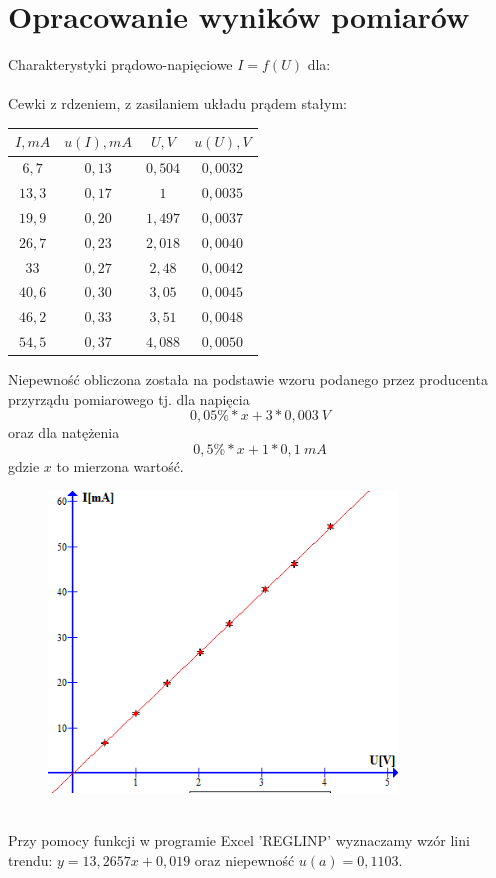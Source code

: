 \documentclass{article}
\begin{document}
\section{Opracowanie wyników pomiarów}
Charakterystyki prądowo-napięciowe $I = f(U)$ dla:\\\\
Cewki z rdzeniem, z zasilaniem układu prądem stałym:
\begin{center}
    \begin{tabular}{|c|c|c|c|}
    \hline
$I,mA$ & $u(I), mA$ & $U,V$ & $u(U), V$ \\ \hline
$6,7$ & $0,13$ & $0,504$ & $0,0032$\\ \hline
$13,3$ & $0,17$ & $1$ & $0,0035$\\ \hline
$19,9$ & $0,20$ & $1,497$ & $0,0037$\\ \hline
$26,7$ & $0,23$ & $2,018$ & $0,0040$\\ \hline
$33$ & $0,27$ & $2,48$ & $0,0042$\\ \hline
$40,6$ & $0,30$ & $3,05$ & $0,0045$\\ \hline
$46,2$ & $0,33$ & $3,51$ & $0,0048$\\ \hline
$54,5$ & $0,37$ & $4,088$ & $0,0050$\\ \hline
    \end{tabular}
\end{center}
Niepewność obliczona została na podstawie wzoru podanego przez producenta przyrządu pomiarowego tj. dla napięcia
$$0,05\% * x + 3 * 0,003\ V $$
oraz dla natężenia
$$0,5\% * x + 1 * 0,1\ mA$$
gdzie $x$ to mierzona wartość.
\begin{figure}[ht]
\centering
\includegraphics[height=8cm]{wykres_1.png}
\end{figure}\\
Przy pomocy funkcji w programie Excel 'REGLINP' wyznaczamy wzór lini trendu: $y = 13,2657x + 0,019$ oraz niepewność $u(a) = 0,1103$.\\\\
\end{document}
